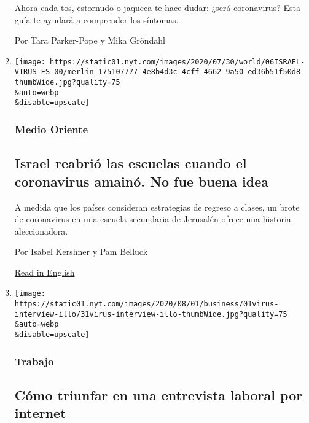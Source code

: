 \begin{enumerate}
  Ahora cada tos, estornudo o jaqueca te hace dudar: ¿será coronavirus?
  Esta guía te ayudará a comprender los síntomas.

  Por Tara Parker-Pope y Mika Gröndahl
\item
  \href{/es/2020/08/06/espanol/mundo/abrir-escuelas-israel-coronavirus.html}{}

  \texttt{[image: https://static01.nyt.com/images/2020/07/30/world/06ISRAEL-VIRUS-ES-00/merlin\_175107777\_4e8b4d3c-4cff-4662-9a50-ed36b51f50d8-thumbWide.jpg?quality=75\\\&auto=webp\\\&disable=upscale]}

  \hypertarget{medio-oriente}{%
  \subsubsection{Medio Oriente}\label{medio-oriente}}

  \hypertarget{israel-reabriuxf3-las-escuelas-cuando-el-coronavirus-amainuxf3-no-fue-buena-idea}{%
  \subsection{Israel reabrió las escuelas cuando el coronavirus amainó.
  No fue buena
  idea}\label{israel-reabriuxf3-las-escuelas-cuando-el-coronavirus-amainuxf3-no-fue-buena-idea}}

  A medida que los países consideran estrategias de regreso a clases, un
  brote de coronavirus en una escuela secundaria de Jerusalén ofrece una
  historia aleccionadora.

  Por Isabel Kershner y Pam Belluck

  \href{https://www.nytimes.com/2020/08/04/world/middleeast/coronavirus-israel-schools-reopen.html}{Read
  in English}
\item
  \href{/es/2020/08/06/espanol/negocios/entrevista-de-trabajo-internet.html}{}

  \texttt{[image: https://static01.nyt.com/images/2020/08/01/business/01virus-interview-illo/31virus-interview-illo-thumbWide.jpg?quality=75\\\&auto=webp\\\&disable=upscale]}

  \hypertarget{trabajo}{%
  \subsubsection{Trabajo}\label{trabajo}}

  \hypertarget{cuxf3mo-triunfar-en-una-entrevista-laboral-por-internet}{%
  \subsection{Cómo triunfar en una entrevista laboral por
  internet}\label{cuxf3mo-triunfar-en-una-entrevista-laboral-por-internet}}


\end{enumerate}

